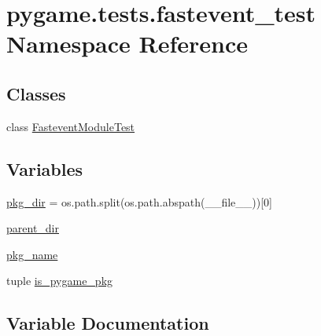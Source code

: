 \hypertarget{namespacepygame_1_1tests_1_1fastevent__test}{}\section{pygame.\+tests.\+fastevent\+\_\+test Namespace Reference}
\label{namespacepygame_1_1tests_1_1fastevent__test}
\subsection*{Classes}
\begin{DoxyCompactItemize}
\item 
class \hyperlink{classpygame_1_1tests_1_1fastevent__test_1_1_fastevent_module_test}{Fastevent\+Module\+Test}
\end{DoxyCompactItemize}
\subsection*{Variables}
\begin{DoxyCompactItemize}
\item 
\hyperlink{namespacepygame_1_1tests_1_1fastevent__test_adfe003bac90ba6da9bf7c4cef4b41347}{pkg\+\_\+dir} = os.\+path.\+split(os.\+path.\+abspath(\+\_\+\+\_\+file\+\_\+\+\_\+))\mbox{[}0\mbox{]}
\item 
\hyperlink{namespacepygame_1_1tests_1_1fastevent__test_a8a27b32908a72da369b62a72bc0fba28}{parent\+\_\+dir}
\item 
\hyperlink{namespacepygame_1_1tests_1_1fastevent__test_a943c9aa086ae89e2b8f47f71cc086239}{pkg\+\_\+name}
\item 
tuple \hyperlink{namespacepygame_1_1tests_1_1fastevent__test_a63f803563fb21c8cf4eef5df6d4d9850}{is\+\_\+pygame\+\_\+pkg}
\end{DoxyCompactItemize}


\subsection{Variable Documentation}
\mbox{\label{namespacepygame_1_1tests_1_1fastevent__test_a63f803563fb21c8cf4eef5df6d4d9850}} 
